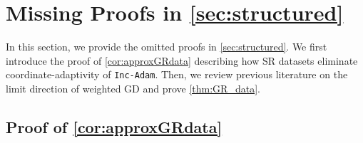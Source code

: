 \documentclass{article} %
\theoremstyle{plain}
\theoremstyle{definition}
\theoremstyle{remark}
\begin{document}
\section[Missing Proofs in Section \ref{sec:structured}]{Missing Proofs in \cref{sec:structured}} \label{appendix:structured}
In this section, we provide the omitted proofs in \cref{sec:structured}. We first introduce the proof of \cref{cor:approxGRdata} describing how SR datasets eliminate coordinate-adaptivity of \texttt{Inc-Adam}. Then, we review previous literature on the limit direction of weighted GD and prove \cref{thm:GR_data}.

\subsection[Proof of Corollary \ref{cor:approxGRdata}]{Proof of \cref{cor:approxGRdata}}
\approxGRdata*
\end{document}
